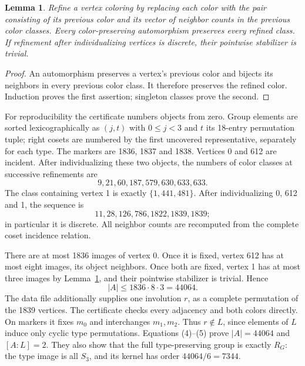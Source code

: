 \documentclass[11pt,a4paper]{article}
\newtheorem{lemma}{Lemma}\newtheorem{theorem}[lemma]{Theorem}
\begin{document}
\begin{lemma}\label{refine}
Refine a vertex coloring by replacing each color with the pair consisting
of its previous color and its vector of neighbor counts in the previous
color classes. Every color-preserving automorphism preserves every
refined class. If refinement after individualizing vertices is discrete,
their pointwise stabilizer is trivial.
\end{lemma}
\begin{proof}
An automorphism preserves a vertex's previous color and bijects its
neighbors in every previous color class. It therefore preserves the
refined color. Induction proves the first assertion; singleton classes
prove the second.
\end{proof}

For reproducibility the certificate numbers objects from zero. Group
elements are sorted lexicographically as $(j,t)$ with $0\leq j<3$ and
$t$ its 18-entry permutation tuple; right cosets are numbered by the first
uncovered representative, separately for each type. The markers are
1836, 1837 and 1838. Vertices 0 and 612 are incident. After individualizing
these two objects, the numbers of color classes at successive refinements
are
\[
 9,21,60,187,579,630,633,633.
\]
The class containing vertex 1 is exactly $\{1,441,481\}$. After
individualizing 0, 612 and 1, the sequence is
\[
 11,28,126,786,1822,1839,1839;
\]
in particular it is discrete. All neighbor counts are recomputed from
the complete coset incidence relation.

There are at most 1836 images of vertex 0. Once it is fixed, vertex 612
has at most eight images, its object neighbors. Once both are fixed,
vertex 1 has at most three images by Lemma~\ref{refine}, and their
pointwise stabilizer is trivial. Hence
\[
 |A|\leq1836\cdot8\cdot3=44064.                            \tag{5}
\]
The data file additionally supplies one involution $r$, as a complete
permutation of the 1839 vertices. The certificate checks every adjacency
and both colors directly. On markers it fixes $m_0$ and interchanges
$m_1,m_2$. Thus $r\notin L$, since elements of $L$ induce only cyclic
type permutations. Equations (4)--(5) prove $|A|=44064$ and $[A:L]=2$.
They also show that the full type-preserving group is exactly $R_G$:
the type image is all $S_3$, and its kernel has order $44064/6=7344$.
\end{document}
